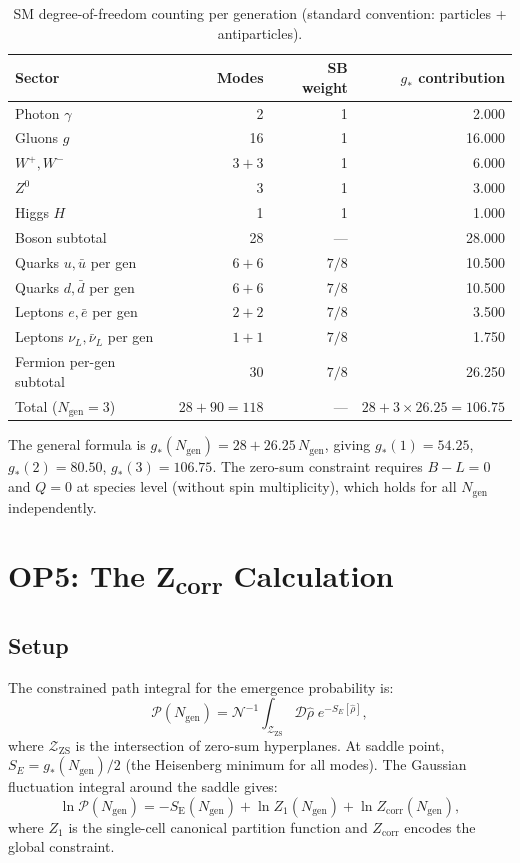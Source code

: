 \documentclass[12pt,a4paper]{article}
\theoremstyle{definition}
\newcommand{\gstar}{g_{*}}
\newcommand{\Ngen}{N_{\mathrm{gen}}}
\newcommand{\ZSC}{\mathcal{Z}_{\mathrm{ZS}}}
\newcommand{\Zcorr}{Z_{\mathrm{corr}}}
\newcommand{\Sact}{S_{\mathrm{E}}}
\begin{document}
\begin{table}[h]
\centering
\caption{SM degree-of-freedom counting per generation
(standard convention: particles + antiparticles).}
\label{tab:gstar_counting}
\begin{tabular}{lrrr}
\toprule
Sector & Modes & SB weight & $\gstar$ contribution \\
\midrule
Photon $\gamma$ & 2 & 1 & 2.000 \\
Gluons $g$ & 16 & 1 & 16.000 \\
$W^+, W^-$ & $3+3$ & 1 & 6.000 \\
$Z^0$ & 3 & 1 & 3.000 \\
Higgs $H$ & 1 & 1 & 1.000 \\
\midrule
Boson subtotal & 28 & — & 28.000 \\
\midrule
Quarks $u, \bar{u}$ per gen & $6+6$ & $7/8$ & 10.500 \\
Quarks $d, \bar{d}$ per gen & $6+6$ & $7/8$ & 10.500 \\
Leptons $e, \bar{e}$ per gen & $2+2$ & $7/8$ & 3.500 \\
Leptons $\nu_L, \bar\nu_L$ per gen & $1+1$ & $7/8$ & 1.750 \\
\midrule
Fermion per-gen subtotal & 30 & $7/8$ & 26.250 \\
\midrule
Total ($\Ngen = 3$) & $28 + 90 = 118$ & — & $28 + 3\times26.25 = \mathbf{106.75}$ \\
\bottomrule
\end{tabular}
\end{table}

The general formula is $\gstar(\Ngen) = 28 + 26.25\,\Ngen$, giving
$\gstar(1) = 54.25$, $\gstar(2) = 80.50$, $\gstar(3) = 106.75$.
The zero-sum constraint requires $B - L = 0$ and $Q = 0$ at species level
(without spin multiplicity), which holds for all $\Ngen$ independently.

\section{OP5: The Z\textsubscript{corr} Calculation}
\label{sec:op5}

\subsection{Setup}

The constrained path integral for the emergence probability is:
\begin{equation}
  \mathcal{P}(\Ngen) = \mathcal{N}^{-1} \int_{\ZSC} \mathcal{D}\hat\rho\;
  e^{-S_E[\hat\rho]},
\end{equation}
where $\ZSC$ is the intersection of zero-sum hyperplanes. At saddle point,
$S_E = \gstar(\Ngen)/2$ (the Heisenberg minimum for all modes). The
Gaussian fluctuation integral around the saddle gives:
\begin{equation}
  \ln \mathcal{P}(\Ngen) = -\Sact(\Ngen) + \ln Z_1(\Ngen) + \ln\Zcorr(\Ngen),
\end{equation}
where $Z_1$ is the single-cell canonical partition function and
$\Zcorr$ encodes the global constraint.
\end{document}
